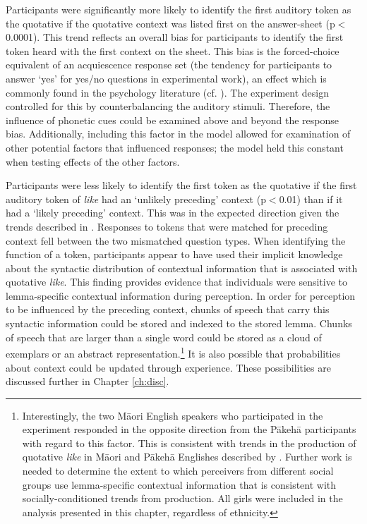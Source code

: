 Participants were significantly more likely to identify the first auditory token as the quotative if the quotative context was listed first on the answer-sheet (p$<$0.0001). This trend reflects an overall bias for participants to identify the first token heard with the first context on the sheet. This bias is the forced-choice equivalent of an acquiescence response set (the tendency for participants to answer `yes' for yes/no questions in experimental work), an effect which is commonly found in the psychology literature (cf. \cite{bentleretal1971}). The experiment design controlled for this by counterbalancing the auditory stimuli. Therefore, the influence of phonetic cues could be examined above and beyond the response bias. Additionally, including this factor in the model allowed for examination of other potential factors that influenced responses; the model held this constant when testing effects of the other factors. 



Participants were less likely to identify the first token as the quotative if the first auditory token of \textit{like} had an `unlikely preceding' context (p$<$0.01) than if it had a `likely preceding' context. This was in the expected direction given the trends described in \citet{buchstallerdarcy2009}. Responses to tokens that were matched for preceding context fell between the two mismatched question types. When identifying the function of a token, participants appear to have used their implicit knowledge about the syntactic distribution of contextual information that is associated with quotative \textit{like}. This finding provides evidence that individuals were sensitive to lemma-specific contextual information during perception. In order for perception to be influenced by the preceding context, chunks of speech that carry this syntactic information could be stored and indexed to the stored lemma. Chunks of speech that are larger than a single word could be stored as a cloud of exemplars or an abstract representation.\footnote{Interestingly, the two M\=aori English speakers who participated in the experiment responded in the opposite direction from the P\=akeh\=a participants with regard to this factor. This is consistent with trends in the production of quotative \textit{like} in M\=aori and P\=akeh\=a Englishes described by \citet{darcy2010}. Further work is needed to determine the extent to which perceivers from different social groups use lemma-specific contextual information that is consistent with socially-conditioned trends from production. All girls were included in the analysis presented in this chapter, regardless of ethnicity.} It is also possible that probabilities about context could be updated through experience. These possibilities are discussed further in Chapter \ref{ch:disc}.


